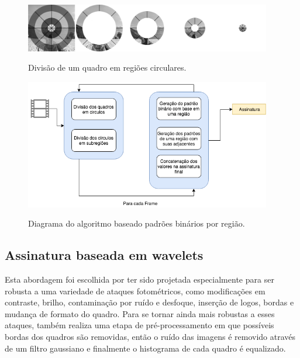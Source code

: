  \begin{figure}[h]
      \centering
      \caption{Divisão de um quadro em regiões circulares.}
      \includegraphics[width=0.96\textwidth]{dados/figuras/brp_aneis}
       	\label{fig:aneis_rbp}
    \end{figure} 

 \begin{figure}[h]
      \centering
      \caption{Diagrama do algoritmo baseado padrões binários por região.}
      \includegraphics[width=0.96\textwidth]{dados/figuras/diagramas/Diag-RBP}
       	\label{fig:dia_rbp}
    \end{figure}  

    
%
%

\subsection{Assinatura baseada em wavelets}
\label{wavelets}

Esta abordagem foi escolhida por ter sido projetada especialmente para ser robusta a uma variedade de ataques fotométricos, como modificações em contraste, brilho, contaminação por ruído e desfoque, inserção de logos, bordas e mudança de formato do quadro. Para se tornar ainda mais robustas a esses ataques,  também realiza uma etapa de pré-processamento em que possíveis bordas dos quadros são removidas, então o ruído das imagens é removido através de um filtro gaussiano e finalmente o histograma de cada quadro é equalizado. 

